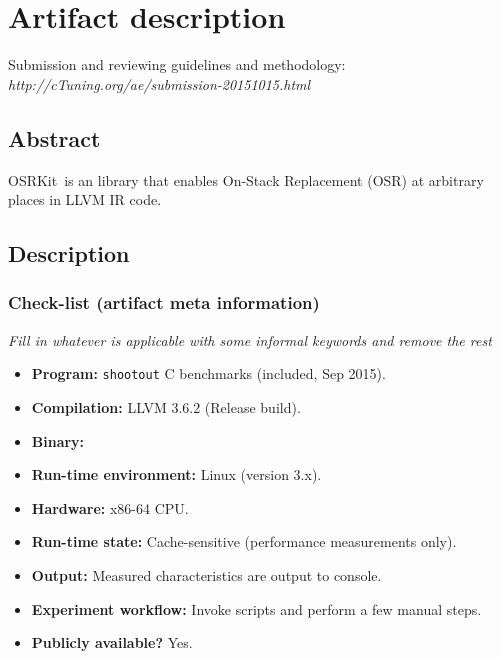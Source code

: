 \documentclass{sigplanconf}
\newcommand{\osrkit}{{\sf OSRKit}}
\begin{document}


\appendix
\section{Artifact description}

Submission and reviewing guidelines and methodology: \\
{\em http://cTuning.org/ae/submission-20151015.html}

\subsection{Abstract}

\osrkit\ is an library that enables On-Stack Replacement (OSR) at arbitrary places in LLVM IR code.

\subsection{Description}

\subsubsection{Check-list (artifact meta information)}

{\em Fill in whatever is applicable with some informal keywords and remove the rest}

{\small
\begin{itemize}
  \item {\bf Program: } {\tt shootout} C benchmarks (included, Sep 2015). %
  \item {\bf Compilation: } LLVM 3.6.2 (Release build).
  \item {\bf Binary: }
  \item {\bf Run-time environment: } Linux (version 3.x).
  \item {\bf Hardware: } x86-64 CPU.
  \item {\bf Run-time state: } Cache-sensitive (performance measurements only).
  \item {\bf Output: } Measured characteristics are output to console.
  \item {\bf Experiment workflow: } Invoke scripts and perform a few manual steps.
  \item {\bf Publicly available?} Yes.
\end{itemize}
}
\end{document}

